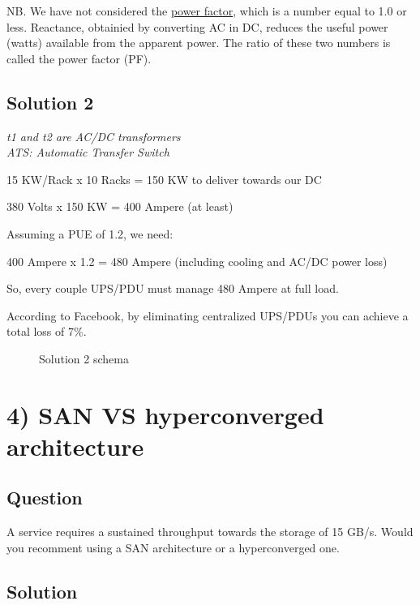 NB. We have not considered the \protect\hyperlink{power-factor}{power
factor}, which is a number equal to 1.0 or less. Reactance, obtainied by
converting AC in DC, reduces the useful power (watts) available from the
apparent power. The ratio of these two numbers is called the power
factor (PF).


\hypertarget{solution-2-1}{%
\subsection{Solution 2}\label{solution-2-1}}

\emph{t1 and t2 are AC/DC transformers}\\
\emph{ATS: Automatic Transfer Switch}

15 KW/Rack x 10 Racks = 150 KW to deliver towards our DC

380 Volts x 150 KW = 400 Ampere (at least)

Assuming a PUE of 1.2, we need:

400 Ampere x 1.2 = 480 Ampere (including cooling and AC/DC power loss)

So, every couple UPS/PDU must manage 480 Ampere at full load.

According to Facebook, by eliminating centralized UPS/PDUs you can
achieve a total loss of 7\%.

\begin{figure} [htbp]
    \centering
    \caption{Solution 2 schema}
    \label{fig:10racks}
\end{figure}

\hypertarget{san-vs-hyperconverged-architecture}{%
\section{4) SAN VS hyperconverged
architecture}\label{san-vs-hyperconverged-architecture}}

\hypertarget{question-3}{%
\subsection{Question}\label{question-3}}

A service requires a sustained throughput towards the storage of 15
GB/s. Would you recomment using a SAN architecture or a hyperconverged
one.

\hypertarget{solution-3}{%
\subsection{Solution}\label{solution-3}}

